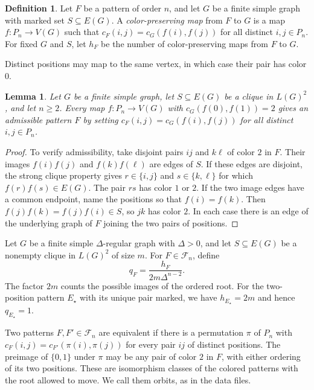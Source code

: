 \documentclass[preprint,11pt,numbers]{elsarticle-arxiv}
\numberwithin{equation}{section}
\newtheorem{lemma}[theorem]{Lemma}
\theoremstyle{definition}
\newtheorem{defn}[theorem]{Definition}
\begin{document}
\begin{defn}\label{def:color-preserving-maps}
Let $F$ be a pattern of order $n$, and let $G$ be a finite simple graph
with marked set $S\subseteq E(G)$. A \emph{color-preserving map} from $F$
to $G$ is a map $f\colon P_n\to V(G)$ such that
$c_F(i,j)=c_G(f(i),f(j))$ for all distinct $i,j\in P_n$.
For fixed $G$ and $S$, let $h_F$ be the number of color-preserving maps
from $F$ to $G$.
\end{defn}

Distinct positions may map to the same vertex, in which case their
pair has color $0$.

\begin{lemma}\label{lem:pullback}
Let $G$ be a finite simple graph, let $S\subseteq E(G)$ be a clique
in $L(G)^2$, and let $n\geq 2$. Every map $f\colon P_n\to V(G)$ with
$c_G(f(0),f(1))=2$ gives an admissible pattern $F$ by setting
$c_F(i,j)=c_G(f(i),f(j))$ for all distinct $i,j\in P_n$.
\end{lemma}

\begin{proof}
To verify admissibility, take disjoint pairs $ij$ and $k\ell$ of
color $2$ in $F$. Their images $f(i)f(j)$ and $f(k)f(\ell)$ are
edges of $S$. If these edges are disjoint, the strong clique
property gives $r\in\{i,j\}$ and $s\in\{k,\ell\}$ for which
$f(r)f(s)\in E(G)$. The pair $rs$ has color $1$ or $2$.
If the two image edges have a common endpoint, name the positions
so that $f(i)=f(k)$. Then $f(j)f(k)=f(j)f(i)\in S$, so $jk$
has color $2$. In each case there is an edge of the underlying
graph of $F$ joining the two pairs of positions.
\end{proof}

Let $G$ be a finite simple $\Delta$-regular graph with $\Delta>0$,
and let $S\subseteq E(G)$ be a nonempty clique in $L(G)^2$ of size $m$.
For $F\in\mathcal F_n$, define
\begin{equation}\label{eq:q-definition}
 q_F=\frac{h_F}{2m\Delta^{n-2}}.
\end{equation}
The factor $2m$ counts the possible images of the ordered root.
For the two-position pattern $E_\star$ with its unique pair marked,
we have $h_{E_\star}=2m$ and hence $q_{E_\star}=1$.

Two patterns $F,F'\in\mathcal F_n$ are equivalent if there is a
permutation $\pi$ of $P_n$ with
$c_F(i,j)=c_{F'}(\pi(i),\pi(j))$ for every pair $ij$ of distinct
positions. The preimage of $\{0,1\}$ under $\pi$ may be any pair of
color $2$ in $F$, with either ordering of its two positions. These
are isomorphism classes of the colored patterns with the root allowed
to move. We call them orbits, as in the data files.
\end{document}
